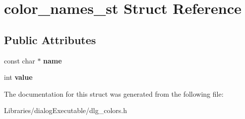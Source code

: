 \hypertarget{structcolor__names__st}{}\section{color\+\_\+names\+\_\+st Struct Reference}
\label{structcolor__names__st}
\subsection*{Public Attributes}
\begin{DoxyCompactItemize}
\item 
const char $\ast$ {\bfseries name}\hypertarget{structcolor__names__st_abc860b86525a0ac8a547b0b3a7c8e9ba}{}\label{structcolor__names__st_abc860b86525a0ac8a547b0b3a7c8e9ba}

\item 
int {\bfseries value}\hypertarget{structcolor__names__st_ab1518518c89b8427513433641eb2efac}{}\label{structcolor__names__st_ab1518518c89b8427513433641eb2efac}

\end{DoxyCompactItemize}


The documentation for this struct was generated from the following file\+:\begin{DoxyCompactItemize}
\item 
Libraries/dialog\+Executable/dlg\+\_\+colors.\+h\end{DoxyCompactItemize}
